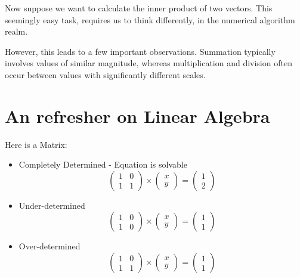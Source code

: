Now suppose we want to calculate the inner product of two vectors. This seemingly easy task, requires us to think differently, in the
numerical algorithm realm.

However, this leads to a few important observations. Summation typically involves values of similar magnitude, whereas multiplication and
division often occur between values with significantly different scales.

\section*{An refresher on Linear Algebra}

Here is a Matrix:

\begin{itemize}
  \item Completely Determined - Equation is solvable
    \begin{equation*}
      \begin{pmatrix}
        1 & 0 \\
        1 & 1
      \end{pmatrix}
      \times
      \begin{pmatrix}
        x \\
        y
      \end{pmatrix} =
      \begin{pmatrix}
        1 \\
        2
      \end{pmatrix}
    \end{equation*}
  \item Under-determined
    \begin{equation*}
      \begin{pmatrix}
        1 & 0 \\
        1 & 0
      \end{pmatrix}
      \times
      \begin{pmatrix}
        x \\
        y
      \end{pmatrix}
      =
      \begin{pmatrix}
        1 \\
        1
      \end{pmatrix}
    \end{equation*}

  \item Over-determined
  \begin{equation*}
    \begin{pmatrix}
      1 & 0 \\
      1 & 1
    \end{pmatrix}
    \times
    \begin{pmatrix}
      x \\
      y
    \end{pmatrix}
    =
    \begin{pmatrix}
      1 \\
      1
    \end{pmatrix}
  \end{equation*}
\end{itemize}

